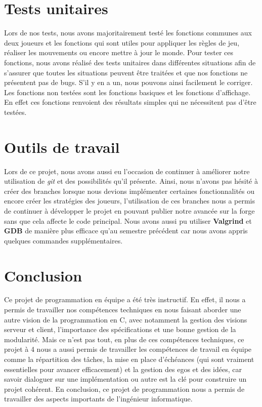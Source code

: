 \documentclass{article}
\begin{document}
\newpage
\section{Tests unitaires}
Lors de nos tests, nous avons majoritairement testé les fonctions communes aux deux joueurs et les fonctions qui sont utiles pour appliquer les règles de jeu, réaliser les mouvements ou encore mettre à jour le monde. Pour tester ces fonctions, nous avons réalisé des tests unitaires dans différentes situations afin de s'assurer que toutes les situations peuvent être traitées et que nos fonctions ne présentent pas de bugs. S'il y en a un, nous pouvons ainsi facilement le corriger. Les fonctions non testées sont les fonctions basiques et les fonctions d'affichage. En effet ces fonctions renvoient des résultats simples qui ne nécessitent pas d'être testées.

\vspace{1cm}
\section{Outils de travail}
Lors de ce projet, nous avons aussi eu l'occasion de continuer à améliorer notre utilisation de \textit{git} et des possibilités qu'il présente. Ainsi, nous n'avons pas hésité à créer des branches lorsque nous devions implémenter certaines fonctionnalités ou encore créer les stratégies des joueurs, l'utilisation de ces branches nous a permis de continuer à développer le projet en pouvant publier notre avancée sur la forge sans que cela affecte le code principal. Nous avons aussi pu utiliser \textbf{Valgrind} et \textbf{GDB} de manière plus efficace qu'au semestre précédent car nous avons appris quelques commandes supplémentaires.

\vspace{1cm}
\section{Conclusion}
Ce projet de programmation en équipe a été très instructif. En effet, il nous a permis de travailler nos compétences techniques en nous faisant aborder une autre vision de la programmation en C, avec notamment la gestion des visions serveur et client, l'importance des spécifications et une bonne gestion de la modularité. Mais ce n'est pas tout, en plus de ces compétences techniques, ce projet à 4 nous a aussi permis de travailler les compétences de travail en équipe comme la répartition des tâches, la mise en place d'échéances (qui sont vraiment essentielles pour avancer efficacement) et la gestion des egos et des idées, car savoir dialoguer sur une implémentation ou autre est la clé pour construire un projet cohérent. En conclusion, ce projet de programmation nous a permis de travailler des aspects importants de l'ingénieur informatique.
\end{document}
